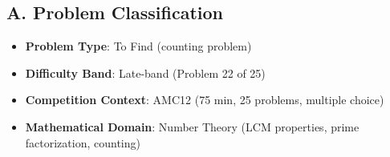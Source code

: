 \documentclass[12pt]{article}
\begin{document}
\begin{problemconfigbox}
\subsection*{A. Problem Classification}
\begin{itemize}[leftmargin=*]
    \item \textbf{Problem Type}: To Find (counting problem)
    \item \textbf{Difficulty Band}: Late-band (Problem 22 of 25)
    \item \textbf{Competition Context}: AMC12 (75 min, 25 problems, multiple choice)
    \item \textbf{Mathematical Domain}: Number Theory (LCM properties, prime factorization, counting)
\end{itemize}


\end{problemconfigbox}
\end{document}
